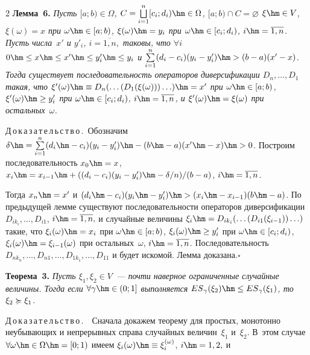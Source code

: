 \begin{multicols}{2}
\noindent
\textbf{Лемма~6.}
\textit{Пусть $[a;b)\in \Omega$, $C = \bigsqcup\limits_{i=1}^n
[c_i;d_i) \hm\in \Omega$, $[a;b) \cap C=\varnothing$
$\xi\hm\in V$, $\xi(\omega)=x$ при $\omega \hm\in [a;b)$,
$\xi(\omega)\hm=y_i$  при  $\omega \hm\in
[c_i;d_i)$, $i\hm=\overline{1,n}$. Пусть чис\-ла~$x'$ и
$y'_i$, $i=\overline{1,n},$ таковы, что $\forall i$ $0 \hm\le x \hm\le x'
\hm\le y_i' \hm\le y_i$ и $\sum\limits_{i=1}^n(d_i-c_i)(y_i-y_i') \hm>
(b-a)(x'-x)$. Тогда существует последовательность операторов
диверсификации $D_n,\ldots,D_1$ такая, что $\xi'(\omega) \hm\equiv
D_n(\ldots(D_1(\xi(\omega)))\ldots) \hm= x'$ при $\omega \hm\in [a;b)$,
$\xi'(\omega) \hm\ge y_i'$ при $\omega \hm\in
[c_i;d_i)$, $i\hm=\overline{1,n}$, и $\xi'(\omega) \hm= \xi(\omega)$ при
остальных~$\omega$.} 

\smallskip

\noindent
Д\,о\,к\,а\,з\,а\,т\,е\,л\,ь\,с\,т\,в\,о\,.\ 
Обозначим
$\delta\hm=\sum\limits_{i=1}^n(d_i\hm-c_i)(y_i-y_i')\hm-(b\hm-a)(x'\hm-x) \hm>0$.
Построим последовательность $x_0\hm=x$, $x_i\hm=x_{i-1} \hm+((d_i-c_i)(y_i-y_i')\hm-\delta / n)/
(b-a)$, $i\hm=\overline{1,n}$.

Тогда $x_n\hm=x'$ и $(d_i\hm-c_i)(y_i\hm-y_i') \hm> (x_i\hm-x_{i-1})(b\hm-a)$. По
предыдущей лемме существуют последовательности операторов
диверсификации $D_{ik_i},\ldots,D_{i1}$, $i\hm=\overline{1,n},$ и
случайные величины $\xi_i\hm=D_{ik_i}(\ldots(D_{i1}(\xi_{i-1}))\ldots)$
такие, что $\xi_i(\omega) \hm= x_i$ при $\omega \hm\in [a;b)$,
$\xi_i(\omega) \hm\ge y_i'$ при $\omega \hm\in [c_i;d_i)$,
$\xi_i(\omega) \hm= \xi_{i-1}(\omega)$ при остальных~$\omega$,
$i\hm=\overline{1,n}$. Последовательность
$D_{nk_n},\ldots,D_{n1},\ldots,D_{1k_1},\ldots,D_{11}$ и будет
искомой. Лемма доказана.\hfill$\square$

\medskip

\noindent
\textbf{Теорема~3.}
\textit{Пусть $\xi_1,\xi_2 \in V$~--- почти наверное
ограниченные случайные величины. Тогда если $\forall
\gamma \hm \in (0;1]$ выполняется ${ES}_\gamma(\xi_2) \hm\le
{ES}_\gamma(\xi_1)$, то $\xi_2 \divers \xi_1$.}

\smallskip

\noindent
Д\,о\,к\,а\,з\,а\,т\,е\,л\,ь\,с\,т\,в\,о\,.\  ~Сначала
докажем теорему для простых, монотонно неубывающих и непрерывных
справа случайных величин~$\xi_1$ и~$\xi_2$. В~этом случае $\forall
\omega \hm\in \Omega\hm=[0;1)$ имеем
$\xi_i(\omega)\hm\equiv\xi_i^{(\omega)}$, $i\hm=1,2,$ и


\end{multicols}
